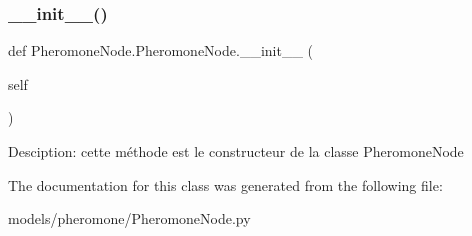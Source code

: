 \subsubsection{\texorpdfstring{\+\_\+\+\_\+init\+\_\+\+\_\+()}{\_\_init\_\_()}}
{\footnotesize\ttfamily def Pheromone\+Node.\+Pheromone\+Node.\+\_\+\+\_\+init\+\_\+\+\_\+ (\begin{DoxyParamCaption}\item[{}]{self }\end{DoxyParamCaption})}

\begin{DoxyVerb}Desciption: cette méthode est le constructeur de la classe PheromoneNode
\end{DoxyVerb}
 

The documentation for this class was generated from the following file\+:\begin{DoxyCompactItemize}
\item 
models/pheromone/Pheromone\+Node.\+py\end{DoxyCompactItemize}
